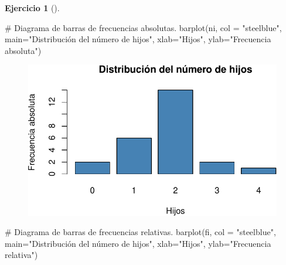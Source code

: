 \documentclass[
  a4paper,
]{scrreport}
\newenvironment{Shaded}{\begin{snugshade}}{\end{snugshade}}
\newcommand{\AttributeTok}[1]{\textcolor[rgb]{0.40,0.45,0.13}{#1}}
\newcommand{\CommentTok}[1]{\textcolor[rgb]{0.37,0.37,0.37}{#1}}
\newcommand{\FunctionTok}[1]{\textcolor[rgb]{0.28,0.35,0.67}{#1}}
\newcommand{\NormalTok}[1]{\textcolor[rgb]{0.00,0.23,0.31}{#1}}
\newcommand{\StringTok}[1]{\textcolor[rgb]{0.13,0.47,0.30}{#1}}
\theoremstyle{definition}
\newtheorem{exercise}{Ejercicio}[chapter]
\theoremstyle{remark}
\begin{document}
\begin{exercise}[]
\begin{enumerate}
\begin{tcolorbox}
\begin{Shaded}
\begin{Highlighting}[]
\CommentTok{\# Diagrama de barras de frecuencias absolutas.}
\FunctionTok{barplot}\NormalTok{(ni, }\AttributeTok{col =} \StringTok{"steelblue"}\NormalTok{, }\AttributeTok{main=}\StringTok{"Distribución del número de hijos"}\NormalTok{, }\AttributeTok{xlab=}\StringTok{"Hijos"}\NormalTok{, }\AttributeTok{ylab=}\StringTok{"Frecuencia absoluta"}\NormalTok{)}
\end{Highlighting}
\end{Shaded}

  \begin{figure}[H]

  {\centering \includegraphics{03-frecuencias-graficos_files/figure-pdf/unnamed-chunk-6-1.pdf}

  }

  \end{figure}

\begin{Shaded}
\begin{Highlighting}[]
\CommentTok{\# Diagrama de barras de frecuencias relativas.}
\FunctionTok{barplot}\NormalTok{(fi, }\AttributeTok{col =} \StringTok{"steelblue"}\NormalTok{, }\AttributeTok{main=}\StringTok{"Distribución del número de hijos"}\NormalTok{, }\AttributeTok{xlab=}\StringTok{"Hijos"}\NormalTok{, }\AttributeTok{ylab=}\StringTok{"Frecuencia relativa"}\NormalTok{)}
\end{Highlighting}
\end{Shaded}

  \begin{figure}[H]


\end{figure}
\end{tcolorbox}
\end{enumerate}
\end{exercise}
\end{document}
